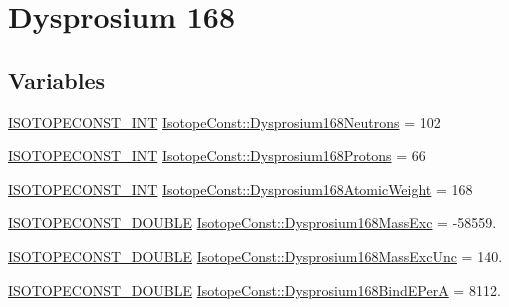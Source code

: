 \hypertarget{group___isotope_const-_dysprosium-_dy168}{}\section{Dysprosium 168}
\label{group___isotope_const-_dysprosium-_dy168}
\subsection*{Variables}
\begin{DoxyCompactItemize}
\item 
\mbox{\hyperlink{group___isotope_const-_macros_ga5f18360b3e99483a35c32d789e62621c}{I\+S\+O\+T\+O\+P\+E\+C\+O\+N\+S\+T\+\_\+\+I\+NT}} \mbox{\hyperlink{group___isotope_const-_dysprosium-_dy168_gaf74262f61688d4d9e6fd12239db63aee}{Isotope\+Const\+::\+Dysprosium168\+Neutrons}} = 102
\item 
\mbox{\hyperlink{group___isotope_const-_macros_ga5f18360b3e99483a35c32d789e62621c}{I\+S\+O\+T\+O\+P\+E\+C\+O\+N\+S\+T\+\_\+\+I\+NT}} \mbox{\hyperlink{group___isotope_const-_dysprosium-_dy168_gacfeadc9df1d750a2df55950e0dfc8c13}{Isotope\+Const\+::\+Dysprosium168\+Protons}} = 66
\item 
\mbox{\hyperlink{group___isotope_const-_macros_ga5f18360b3e99483a35c32d789e62621c}{I\+S\+O\+T\+O\+P\+E\+C\+O\+N\+S\+T\+\_\+\+I\+NT}} \mbox{\hyperlink{group___isotope_const-_dysprosium-_dy168_ga5c5d76c2a9524d075e2c8819d613e5e8}{Isotope\+Const\+::\+Dysprosium168\+Atomic\+Weight}} = 168
\item 
\mbox{\hyperlink{group___isotope_const-_macros_ga8f45a7272ce02c0b4c65c44636ed719a}{I\+S\+O\+T\+O\+P\+E\+C\+O\+N\+S\+T\+\_\+\+D\+O\+U\+B\+LE}} \mbox{\hyperlink{group___isotope_const-_dysprosium-_dy168_ga162c658ab993185788f44ab0759f699f}{Isotope\+Const\+::\+Dysprosium168\+Mass\+Exc}} = -\/58559.
\item 
\mbox{\hyperlink{group___isotope_const-_macros_ga8f45a7272ce02c0b4c65c44636ed719a}{I\+S\+O\+T\+O\+P\+E\+C\+O\+N\+S\+T\+\_\+\+D\+O\+U\+B\+LE}} \mbox{\hyperlink{group___isotope_const-_dysprosium-_dy168_ga236f5d57745bd419569b9eb3ea3b39ae}{Isotope\+Const\+::\+Dysprosium168\+Mass\+Exc\+Unc}} = 140.
\item 
\mbox{\hyperlink{group___isotope_const-_macros_ga8f45a7272ce02c0b4c65c44636ed719a}{I\+S\+O\+T\+O\+P\+E\+C\+O\+N\+S\+T\+\_\+\+D\+O\+U\+B\+LE}} \mbox{\hyperlink{group___isotope_const-_dysprosium-_dy168_ga8cd14efa6142767029c844635cb51597}{Isotope\+Const\+::\+Dysprosium168\+Bind\+E\+PerA}} = 8112.

\end{DoxyCompactItemize}
